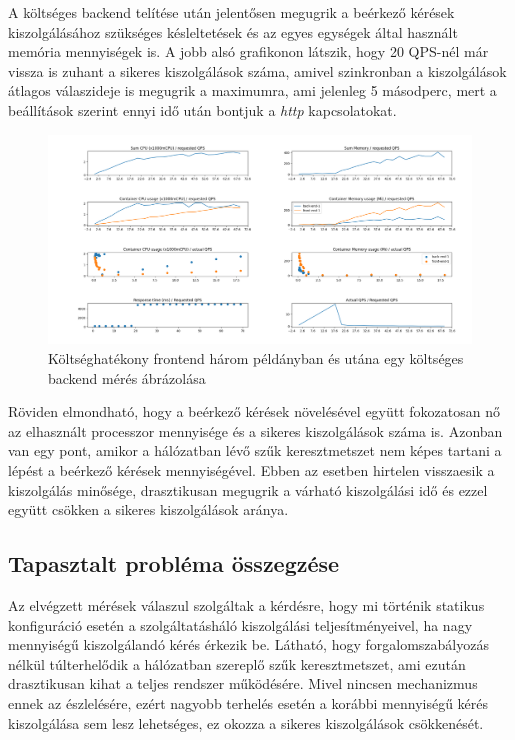 A költséges backend telítése után jelentősen megugrik a beérkező kérések kiszolgálásához szükséges késleltetések és az egyes egységek által használt memória mennyiségek is.
A jobb alsó grafikonon látszik, hogy 20 QPS-nél már vissza is zuhant a sikeres kiszolgálások száma, amivel szinkronban a kiszolgálások átlagos válaszideje is megugrik a maximumra, ami jelenleg 5 másodperc, mert a beállítások szerint ennyi idő után bontjuk a \textit{http} kapcsolatokat.

\begin{figure}[!ht]
	\centering
	\includegraphics[width=150mm, keepaspectratio]{figures/multiFE-singleBE.png}
	\caption{Költséghatékony frontend három példányban és utána egy költséges backend mérés ábrázolása}
	\label{fig:3FE_stack_1BE}
\end{figure}

Röviden elmondható, hogy a beérkező kérések növelésével együtt fokozatosan nő az elhasznált processzor mennyisége és a sikeres kiszolgálások száma is.
Azonban van egy pont, amikor a hálózatban lévő szűk keresztmetszet nem képes tartani a lépést a beérkező kérések mennyiségével. 
Ebben az esetben hirtelen visszaesik a kiszolgálás minősége, drasztikusan megugrik a várható kiszolgálási idő és ezzel együtt csökken a sikeres kiszolgálások aránya.


\subsection{Tapasztalt probléma összegzése}
Az elvégzett mérések válaszul szolgáltak a kérdésre, hogy mi történik statikus konfiguráció esetén a szolgáltatásháló kiszolgálási teljesítményeivel, ha nagy mennyiségű kiszolgálandó kérés érkezik be.
Látható, hogy forgalomszabályozás nélkül túlterhelődik a hálózatban szereplő szűk keresztmetszet, ami ezután drasztikusan kihat a teljes rendszer működésére.
Mivel nincsen mechanizmus ennek az észlelésére, ezért nagyobb terhelés esetén a korábbi mennyiségű kérés kiszolgálása sem lesz lehetséges, ez okozza a sikeres kiszolgálások csökkenését.

